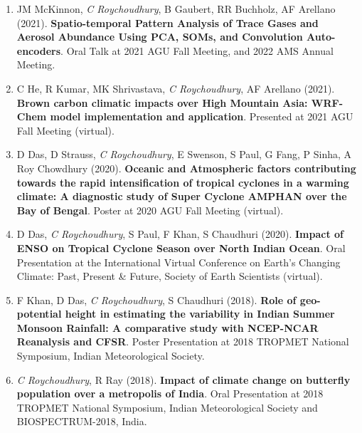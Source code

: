 \documentclass[margin,line]{resume}
\begin{document}
\begin{resume}
\begin{enumerate}[topsep=1pt, partopsep=1pt, itemsep=0.5pt, parsep=0.1pt, leftmargin=15pt,label=\arabic*.]
			\item JM McKinnon, \textit{C Roychoudhury}, B Gaubert, RR Buchholz, AF Arellano (2021).
			\textbf{Spatio-temporal Pattern Analysis of Trace Gases and Aerosol Abundance Using PCA, SOMs, and Convolution Auto-encoders}.
			Oral Talk at 2021 AGU Fall Meeting, and 2022 AMS Annual Meeting.
			
			\item C He, R Kumar, MK Shrivastava, \textit{C Roychoudhury}, AF Arellano (2021).
			\textbf{Brown carbon climatic impacts over High Mountain Asia: WRF-Chem model implementation and application}.
			Presented at 2021 AGU Fall Meeting (virtual).
			
			\item D Das, D Strauss, \textit{C Roychoudhury}, E Swenson, S Paul, G Fang, P Sinha, A Roy Chowdhury (2020).
			\textbf{Oceanic and Atmospheric factors contributing towards the rapid intensification of tropical cyclones in a warming climate: A diagnostic study of Super Cyclone AMPHAN over the Bay of Bengal}.
			Poster at 2020 AGU Fall Meeting (virtual).
			
			\item D Das, \textit{C Roychoudhury}, S Paul, F Khan, S Chaudhuri (2020). \textbf{Impact of ENSO on Tropical Cyclone Season over North Indian Ocean}. Oral Presentation at the International Virtual Conference on Earth's Changing Climate: Past, Present \& Future, Society of Earth Scientists (virtual).
				
			\item F Khan, D Das, \textit{C Roychoudhury}, S Chaudhuri (2018).		\textbf{Role of geo-potential height in estimating the variability in Indian Summer Monsoon Rainfall: A comparative study with NCEP-NCAR Reanalysis and CFSR}. Poster Presentation at  %
			2018 TROPMET National Symposium, Indian Meteorological Society.
			
				\item \textit{C Roychoudhury}, R Ray (2018).
			\textbf{Impact of climate change on butterfly population over a metropolis of India}.
				Oral Presentation at %
				2018 TROPMET National Symposium, Indian Meteorological Society and BIOSPECTRUM-2018, India.
			

\end{enumerate}
\end{resume}
\end{document}
